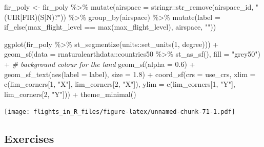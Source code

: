 \documentclass[
]{book}
\newenvironment{Shaded}{\begin{snugshade}}{\end{snugshade}}
\newcommand{\AttributeTok}[1]{\textcolor[rgb]{0.77,0.63,0.00}{#1}}
\newcommand{\CommentTok}[1]{\textcolor[rgb]{0.56,0.35,0.01}{\textit{#1}}}
\newcommand{\DecValTok}[1]{\textcolor[rgb]{0.00,0.00,0.81}{#1}}
\newcommand{\FloatTok}[1]{\textcolor[rgb]{0.00,0.00,0.81}{#1}}
\newcommand{\FunctionTok}[1]{\textcolor[rgb]{0.00,0.00,0.00}{#1}}
\newcommand{\NormalTok}[1]{#1}
\newcommand{\OtherTok}[1]{\textcolor[rgb]{0.56,0.35,0.01}{#1}}
\newcommand{\SpecialCharTok}[1]{\textcolor[rgb]{0.00,0.00,0.00}{#1}}
\newcommand{\StringTok}[1]{\textcolor[rgb]{0.31,0.60,0.02}{#1}}
\begin{document}
\begin{Shaded}
\begin{Highlighting}[]
\NormalTok{fir\_poly }\OtherTok{\textless{}{-}}\NormalTok{ fir\_poly }\SpecialCharTok{\%\textgreater{}\%} 
  \FunctionTok{mutate}\NormalTok{(}\AttributeTok{airspace =}\NormalTok{ stringr}\SpecialCharTok{::}\FunctionTok{str\_remove}\NormalTok{(airspace\_id, }\StringTok{"(UIR|FIR)(S|N)?"}\NormalTok{)) }\SpecialCharTok{\%\textgreater{}\%} 
  \FunctionTok{group\_by}\NormalTok{(airspace) }\SpecialCharTok{\%\textgreater{}\%} 
  \FunctionTok{mutate}\NormalTok{(}\AttributeTok{label =} \FunctionTok{if\_else}\NormalTok{(max\_flight\_level }\SpecialCharTok{==} \FunctionTok{max}\NormalTok{(max\_flight\_level),}
\NormalTok{                         airspace, }\StringTok{""}\NormalTok{))}

\FunctionTok{ggplot}\NormalTok{(fir\_poly }\SpecialCharTok{\%\textgreater{}\%} 
         \FunctionTok{st\_segmentize}\NormalTok{(units}\SpecialCharTok{::}\FunctionTok{set\_units}\NormalTok{(}\DecValTok{1}\NormalTok{, degree))) }\SpecialCharTok{+}
  \FunctionTok{geom\_sf}\NormalTok{(}\AttributeTok{data =}\NormalTok{ rnaturalearthdata}\SpecialCharTok{::}\NormalTok{countries50 }\SpecialCharTok{\%\textgreater{}\%} 
            \FunctionTok{st\_as\_sf}\NormalTok{(),}
          \AttributeTok{fill =} \StringTok{"grey50"}\NormalTok{) }\SpecialCharTok{+} \CommentTok{\# background colour for the land}
  \FunctionTok{geom\_sf}\NormalTok{(}\AttributeTok{alpha =} \FloatTok{0.6}\NormalTok{) }\SpecialCharTok{+}
  \FunctionTok{geom\_sf\_text}\NormalTok{(}\FunctionTok{aes}\NormalTok{(}\AttributeTok{label =}\NormalTok{ label), }\AttributeTok{size =} \FloatTok{1.8}\NormalTok{) }\SpecialCharTok{+}
  \FunctionTok{coord\_sf}\NormalTok{(}\AttributeTok{crs =}\NormalTok{ use\_crs, }
           \AttributeTok{xlim =} \FunctionTok{c}\NormalTok{(lim\_corners[}\DecValTok{1}\NormalTok{, }\StringTok{"X"}\NormalTok{], lim\_corners[}\DecValTok{2}\NormalTok{, }\StringTok{"X"}\NormalTok{]), }
           \AttributeTok{ylim =} \FunctionTok{c}\NormalTok{(lim\_corners[}\DecValTok{1}\NormalTok{, }\StringTok{"Y"}\NormalTok{], lim\_corners[}\DecValTok{2}\NormalTok{, }\StringTok{"Y"}\NormalTok{])) }\SpecialCharTok{+}
  \FunctionTok{theme\_minimal}\NormalTok{()}
\end{Highlighting}
\end{Shaded}

\texttt{[image: flights\_in\_R\_files/figure-latex/unnamed-chunk-71-1.pdf]}

\hypertarget{exercises-6}{%
\subsection{Exercises}\label{exercises-6}}
\end{document}
